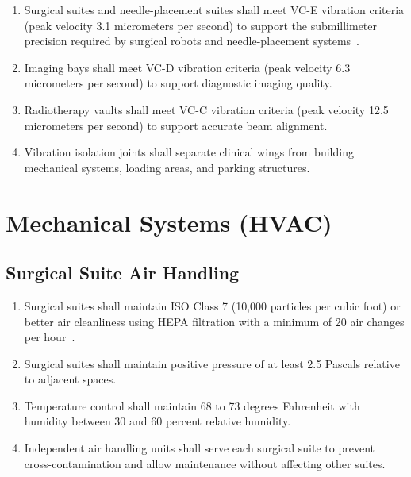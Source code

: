 \documentclass[11pt,letterpaper]{article}
\begin{document}
\begin{enumerate}[label=(\alph*)]
\item Surgical suites and needle-placement suites shall meet VC-E vibration
  criteria (peak velocity 3.1 micrometers per second) to support the
  submillimeter precision required by surgical robots and needle-placement
  systems~\cite{newtrial2026}.

\item Imaging bays shall meet VC-D vibration criteria (peak velocity 6.3
  micrometers per second) to support diagnostic imaging quality.

\item Radiotherapy vaults shall meet VC-C vibration criteria (peak velocity
  12.5 micrometers per second) to support accurate beam alignment.

\item Vibration isolation joints shall separate clinical wings from building
  mechanical systems, loading areas, and parking structures.
\end{enumerate}

\section{Mechanical Systems (HVAC)}

\subsection{Surgical Suite Air Handling}

\begin{enumerate}[label=(\alph*)]
\item Surgical suites shall maintain ISO Class 7 (10,000 particles per cubic
  foot) or better air cleanliness using HEPA filtration with a minimum of 20
  air changes per hour~\cite{sitespec2026}.

\item Surgical suites shall maintain positive pressure of at least 2.5 Pascals
  relative to adjacent spaces.

\item Temperature control shall maintain 68 to 73 degrees Fahrenheit with
  humidity between 30 and 60 percent relative humidity.

\item Independent air handling units shall serve each surgical suite to prevent
  cross-contamination and allow maintenance without affecting other suites.
\end{enumerate}
\end{document}
